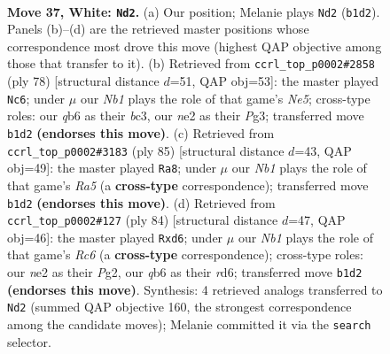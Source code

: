 \documentclass[11pt]{article}
\begin{document}
\clearpage

\begin{figure}[p]\centering
\begin{subfigure}{0.46\textwidth}\centering
\resizebox{\linewidth}{!}{%
\newchessgame
\chessboard[
  setfen={r5k1/1p3p2/1q4p1/p2Q4/7p/7P/P3nPP1/bN5K w - - 1 37},
  showmover=false,
  pgfstyle=straightmove, color=movearrow, markmove={b1-d2}
]}
\caption{}
\end{subfigure}\hfill
\begin{subfigure}{0.46\textwidth}\centering
\resizebox{\linewidth}{!}{%
\newchessgame
\chessboard[
  setfen={4q1k1/5pp1/7p/p2QN2P/8/1Pb3P1/5P2/5K2 w - - 12 40},
  showmover=false,
  pgfstyle=straightmove, color=movearrow, markmove={e5-c6}
]}
\caption{}
\end{subfigure}
\\[4pt]
\begin{subfigure}{0.46\textwidth}\centering
\resizebox{\linewidth}{!}{%
\newchessgame
\chessboard[
  setfen={8/5p1k/6p1/3p2P1/r1P4P/1Q2Pq2/5P2/2R2K2 b - - 1 43},
  showmover=false,
  pgfstyle=straightmove, color=movearrow, markmove={a4-a8}
]}
\caption{}
\end{subfigure}\hfill
\begin{subfigure}{0.46\textwidth}\centering
\resizebox{\linewidth}{!}{%
\newchessgame
\chessboard[
  setfen={5q1k/5p1p/p1Rr1p2/Pp2p2Q/4P3/7P/6P1/7K w - - 2 43},
  showmover=false,
  pgfstyle=straightmove, color=movearrow, markmove={c6-d6}
]}
\caption{}
\end{subfigure}
\caption{\textbf{Move 37, White: \texttt{Nd2}.} (a) Our position; Melanie plays \texttt{Nd2} (\texttt{b1d2}). Panels (b)--(d) are the retrieved master positions whose correspondence most drove this move (highest QAP objective among those that transfer to it). (b) Retrieved from \texttt{ccrl\_top\_p0002\#2858} (ply 78) [structural distance $d$=51, QAP obj=53]: the master played \texttt{Nc6}; under $\mu$ our \emph{Nb1} plays the role of that game's \emph{Ne5}; cross-type roles: our \emph{q}b6 as their \emph{b}c3, our \emph{n}e2 as their \emph{P}g3; transferred move \texttt{b1d2} \textbf{(endorses this move)}. (c) Retrieved from \texttt{ccrl\_top\_p0002\#3183} (ply 85) [structural distance $d$=43, QAP obj=49]: the master played \texttt{Ra8}; under $\mu$ our \emph{Nb1} plays the role of that game's \emph{Ra5} (a \textbf{cross-type} correspondence); transferred move \texttt{b1d2} \textbf{(endorses this move)}. (d) Retrieved from \texttt{ccrl\_top\_p0002\#127} (ply 84) [structural distance $d$=47, QAP obj=46]: the master played \texttt{Rxd6}; under $\mu$ our \emph{Nb1} plays the role of that game's \emph{Rc6} (a \textbf{cross-type} correspondence); cross-type roles: our \emph{n}e2 as their \emph{P}g2, our \emph{q}b6 as their \emph{r}d6; transferred move \texttt{b1d2} \textbf{(endorses this move)}. Synthesis: 4 retrieved analogs transferred to \texttt{Nd2} (summed QAP objective 160, the strongest correspondence among the candidate moves); Melanie committed it via the \texttt{search} selector.}
\label{fig:thought-m72}
\end{figure}
\end{document}
